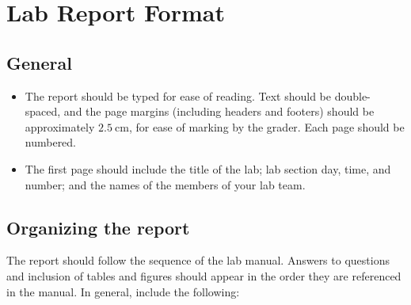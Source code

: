 \chapter{Lab Report Format}\label{cha:lab-report-format}



\section{General}

\begin{itemize}
	\item The report should be typed for ease of reading. Text should be double-spaced, and the page margins (including headers and footers) should be approximately $2.5\:$cm, for ease of marking by the grader. Each page should be numbered.
	
	\item The first page should include the title of the lab; lab section day, time, and number; and the names of the members of your lab team.
	
\end{itemize}

\section{Organizing the report}


The report should follow the sequence of the lab manual. Answers to questions and inclusion of tables and figures should appear in the order they are referenced in the manual. In general, include the following:

